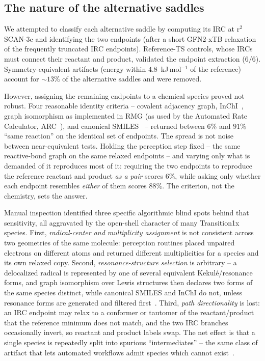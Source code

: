 \documentclass[11pt]{article}
\begin{document}
\subsection{The nature of the alternative saddles}
\label{sec:irc}
We attempted to classify each alternative saddle by computing its
IRC at r$^2$SCAN-3c and identifying the two endpoints
(after a short GFN2-xTB relaxation of the frequently truncated IRC endpoints).
Reference-TS controls, whose IRCs must connect their reactant and
product, validated the endpoint extraction ($6/6$). Symmetry-equivalent artifacts
(energy within $4.8$~kJ\,mol$^{-1}$ of the reference) account for $\sim 13\%$ of the
alternative saddles and were removed.

However, assigning the remaining endpoints to a chemical species proved
not robust. Four reasonable identity criteria -- covalent adjacency
graph, InChI~\cite{Heller2015}, graph isomorphism as implemented in RMG (as used by the Automated Rate Calculator,
ARC~\cite{ARC}), and canonical SMILES~\cite{Weininger1988} -- returned between
$6\%$ and $91\%$ ``same reaction'' on the identical set of endpoints. The spread
is not noise between near-equivalent tests. Holding the perception step fixed --
the same reactive-bond graph on the same relaxed endpoints -- and varying only
what is demanded of it reproduces most of it: requiring the two endpoints to
reproduce the reference reactant and product \emph{as a pair} scores $6\%$, while
asking only whether each endpoint resembles \emph{either} of them scores $88\%$.
The criterion, not the chemistry, sets the answer.

Manual inspection identified three specific algorithmic blind spots behind that
sensitivity, all aggravated by the open-shell character of many Transition1x
species. First, \emph{radical-center and multiplicity assignment} is not
consistent across two geometries of the same molecule: perception routines placed
unpaired electrons on different atoms and returned different multiplicities for a
species and its own relaxed copy. Second, \emph{resonance-structure selection} is
arbitrary -- a delocalized radical is represented by one of several equivalent
Kekul\'e/resonance forms, and graph isomorphism over Lewis structures then
declares two forms of the same species distinct, while canonical SMILES and InChI
do not, unless resonance forms are generated and filtered
first~\cite{GrinbergDana2019}. Third, \emph{path directionality} is lost: an IRC
endpoint may relax to a conformer or tautomer of the reactant/product that the
reference minimum does not match, and the two IRC branches occasionally invert,
so reactant and product labels swap. The net effect is that a single species is
repeatedly split into spurious ``intermediates'' -- the same class of artifact
that lets automated workflows admit species which cannot
exist~\cite{Mitnik2022}.
\end{document}
